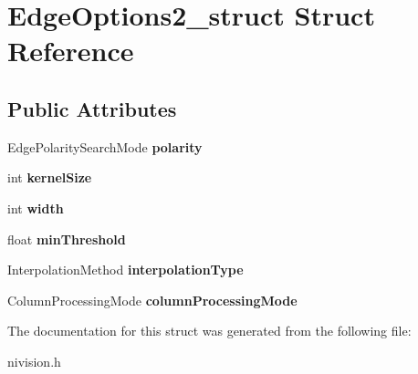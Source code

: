 \hypertarget{structEdgeOptions2__struct}{\section{\-Edge\-Options2\-\_\-struct \-Struct \-Reference}
\label{structEdgeOptions2__struct}
}
\subsection*{\-Public \-Attributes}
\begin{DoxyCompactItemize}
\item 
\hypertarget{structEdgeOptions2__struct_a5a45dead630f52402716a42710bc9e67}{\-Edge\-Polarity\-Search\-Mode {\bfseries polarity}}\label{structEdgeOptions2__struct_a5a45dead630f52402716a42710bc9e67}

\item 
\hypertarget{structEdgeOptions2__struct_a3857afc09dc65b85da63d59f1ae18430}{int {\bfseries kernel\-Size}}\label{structEdgeOptions2__struct_a3857afc09dc65b85da63d59f1ae18430}

\item 
\hypertarget{structEdgeOptions2__struct_a51d2d66bf19cc92304442055b33d3339}{int {\bfseries width}}\label{structEdgeOptions2__struct_a51d2d66bf19cc92304442055b33d3339}

\item 
\hypertarget{structEdgeOptions2__struct_a0dfaeb143d7c3471ed1b8337d20ac9ec}{float {\bfseries min\-Threshold}}\label{structEdgeOptions2__struct_a0dfaeb143d7c3471ed1b8337d20ac9ec}

\item 
\hypertarget{structEdgeOptions2__struct_aa9920d7d1c0d64c67cd3e1cee73f10f2}{\-Interpolation\-Method {\bfseries interpolation\-Type}}\label{structEdgeOptions2__struct_aa9920d7d1c0d64c67cd3e1cee73f10f2}

\item 
\hypertarget{structEdgeOptions2__struct_a468f19e78ae6656a667865e2ed75c747}{\-Column\-Processing\-Mode {\bfseries column\-Processing\-Mode}}\label{structEdgeOptions2__struct_a468f19e78ae6656a667865e2ed75c747}

\end{DoxyCompactItemize}


\-The documentation for this struct was generated from the following file\-:\begin{DoxyCompactItemize}
\item 
nivision.\-h\end{DoxyCompactItemize}
